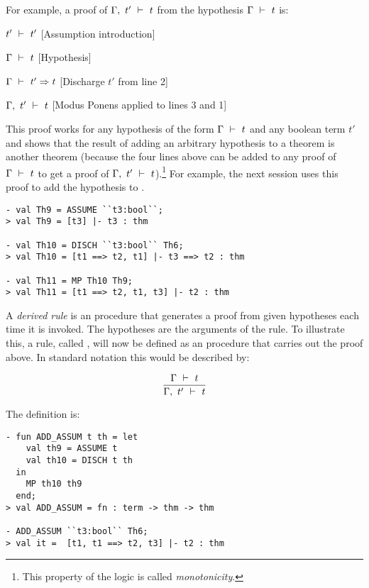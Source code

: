 For example, a proof of $\Gamma,\ t'\ \vdash\  t$ from the hypothesis
$\Gamma\ \vdash\  t$ is:


\begin{proofenumerate}
\item $ t'\ \vdash\  t'$ \hfill [Assumption introduction]
\item $ \Gamma\ \vdash\  t$ \hfill [Hypothesis]
\item $ \Gamma\ \vdash\  t'\Rightarrow t$ \hfill [Discharge $t'$ from line 2]
\item $ \Gamma,\ t'\ \vdash\  t$ \hfill [Modus Ponens applied to lines 3 and 1]
\end{proofenumerate}

\noindent This proof works for any hypothesis of the form $\Gamma\ \vdash\  t$
and any boolean term $t'$ and shows that the result of adding an
arbitrary hypothesis to a theorem is another theorem (because the four
lines above can be added to any proof of $\Gamma\ \vdash\  t$ to get a
proof of $\Gamma,\ t'\ \vdash\  t$).\footnote{This property of the logic is
  called {\it monotonicity}.} For example, the next session uses this
proof to add the hypothesis  to .

\begin{session}\begin{verbatim}
- val Th9 = ASSUME ``t3:bool``;
> val Th9 = [t3] |- t3 : thm

- val Th10 = DISCH ``t3:bool`` Th6;
> val Th10 = [t1 ==> t2, t1] |- t3 ==> t2 : thm

- val Th11 = MP Th10 Th9;
> val Th11 = [t1 ==> t2, t1, t3] |- t2 : thm
\end{verbatim}\end{session}


    A {\it derived rule\/} is an \ML{} procedure that generates a proof
    from given hypotheses each time it is invoked. The hypotheses are
    the arguments of the rule.  To illustrate this, a rule, called
    , will now be defined as an \ML{} procedure that
    carries out the proof above. In standard notation this would be
    described by:

\[ \frac{\Gamma\ \vdash\  t}{\Gamma,\ t'\ \vdash\  t} \]

\noindent The \ML{} definition is:

\begin{session}\begin{verbatim}
- fun ADD_ASSUM t th = let
    val th9 = ASSUME t
    val th10 = DISCH t th
  in
    MP th10 th9
  end;
> val ADD_ASSUM = fn : term -> thm -> thm

- ADD_ASSUM ``t3:bool`` Th6;
> val it =  [t1, t1 ==> t2, t3] |- t2 : thm
\end{verbatim}\end{session}

